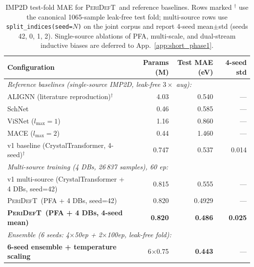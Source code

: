 \documentclass[11pt,a4paper]{article}
\newcommand{\modelname}{\textsc{PeriDefT}}
\begin{document}
\begin{table}[h]
\centering
\caption{IMP2D test-fold MAE for \modelname\ and reference baselines.
Rows marked $^\dagger$ use the canonical 1065-sample leak-free test
fold; multi-source rows use \texttt{split\_indices(seed=$N$)} on
the joint corpus and report 4-seed mean$\pm$std (seeds 42, 0, 1, 2).
Single-source ablations of PFA, multi-scale, and dual-stream
inductive biases are deferred to App.~\ref{app:short_phase1}.}
\label{tab:headline_short}
\begin{tabular}{lrrr}
\toprule
Configuration & Params (M) & Test MAE (eV) & 4-seed std \\
\midrule
\multicolumn{4}{l}{\emph{Reference baselines (single-source IMP2D, leak-free $3\times$ aug):}} \\
ALIGNN (literature reproduction)$^\dagger$            & 4.03 & 0.540   & --- \\
SchNet                                                & 0.46 & 0.585   & --- \\
ViSNet ($l_{\max}=1$)                                 & 1.16 & 0.860   & --- \\
MACE ($l_{\max}=2$)                                   & 0.44 & 1.460   & --- \\
v1 baseline (CrystalTransformer, 4-seed)$^\dagger$    & 0.747 & 0.537  & 0.014 \\
\midrule
\multicolumn{4}{l}{\emph{Multi-source training (4 DBs, 26\,837 samples), 60 ep:}} \\
v1 multi-source (CrystalTransformer + 4 DBs, seed=42) & 0.815 & 0.555  & --- \\
\modelname\ (PFA + 4 DBs, seed=42)                    & 0.820 & 0.4929 & --- \\
\textbf{\modelname\ (PFA + 4 DBs, 4-seed mean)}       & \textbf{0.820} & \textbf{0.486} & \textbf{0.025} \\
\midrule
\multicolumn{4}{l}{\emph{Ensemble (6 seeds: 4$\times$50ep + 2$\times$100ep, leak-free fold):}} \\
\textbf{6-seed ensemble + temperature scaling}         & 6$\times$0.75 & \textbf{0.443} & --- \\
\bottomrule
\end{tabular}
\end{table}
\end{document}

